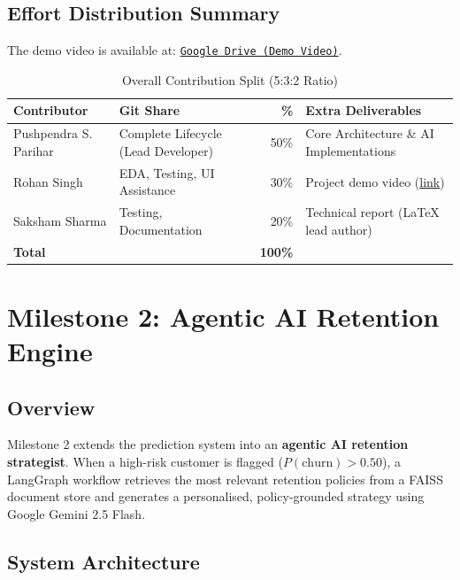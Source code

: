 \documentclass[12pt,a4paper]{article}
\begin{document}
\subsection{Effort Distribution Summary}

The demo video is available at: \href{https://drive.google.com/file/d/1u08SJbGc92HiiyLoe42iHyELQlHl03aQ/view?usp=sharing}{\texttt{Google Drive (Demo Video)}}.

\begin{table}[H]
\centering
\caption{Overall Contribution Split (5:3:2 Ratio)}
\begin{tabular}{llrp{6cm}}
    \toprule
    \textbf{Contributor} & \textbf{Git Share} & \textbf{\%} & \textbf{Extra Deliverables} \\
    \midrule
    Pushpendra S. Parihar & Complete Lifecycle (Lead Developer) & 50\% & Core Architecture \& AI Implementations \\
    Rohan Singh           & EDA, Testing, UI Assistance & 30\% & Project demo video (\href{https://drive.google.com/file/d/1u08SJbGc92HiiyLoe42iHyELQlHl03aQ/view?usp=sharing}{link}) \\
    Saksham Sharma        & Testing, Documentation & 20\% & Technical report (LaTeX lead author) \\
    \midrule
    \textbf{Total} & & \textbf{100\%} & \\
    \bottomrule
\end{tabular}
\end{table}

\section{Milestone 2: Agentic AI Retention Engine}

\subsection{Overview}

Milestone 2 extends the prediction system into an \textbf{agentic AI retention strategist}. When a high-risk customer is flagged ($P(\text{churn}) > 0.50$), a LangGraph workflow retrieves the most relevant retention policies from a FAISS document store and generates a personalised, policy-grounded strategy using Google Gemini 2.5 Flash.

\subsection{System Architecture}
\end{document}
